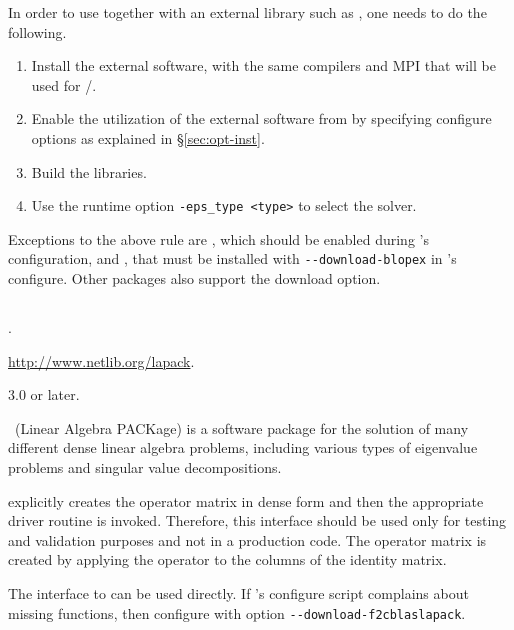 	In order to use \slepc together with an external library such as \arpack, one needs to do the following.
	\begin{enumerate}
	\item Install the external software, with the same compilers and MPI that will be used for \petsc/\slepc.
	\item Enable the utilization of the external software from \slepc by specifying configure options as explained in \S\ref{sec:opt-inst}.
 	\item Build the \slepc libraries.
	\item Use the runtime option \Verb!-eps_type <type>! to select the solver.
	\end{enumerate}

	Exceptions to the above rule are \lapack, which should be enabled during \petsc's configuration, and \blopex, that must be installed with \Verb!--download-blopex! in \slepc's configure. Other packages also support the download option.

\subsection*{\underline{\lapack}}
	\begin{description}
	\setlength{\itemsep}{0pt}
	\item[References.]\citep{Anderson:1992:LUG}.
	\item[Website.] \url{http://www.netlib.org/lapack}.
	\item[Version.] 3.0 or later.
	\item[Summary.] \lapack\ (Linear Algebra PACKage) is a software package for the solution of many different dense linear algebra problems, including various types of eigenvalue problems and singular value decompositions.

	\slepc explicitly creates the operator matrix in dense form and then the appropriate \lapack driver routine is invoked. Therefore, this interface should be used only for testing and validation purposes and not in a production code. The operator matrix is created by applying the operator to the columns of the identity matrix.

	\item[Installation.]
	The \slepc interface to \lapack can be used directly. If \slepc's configure script complains about missing \lapack functions, then configure \petsc with option \texttt{-{}-download-f2cblaslapack}.
	\end{description}

